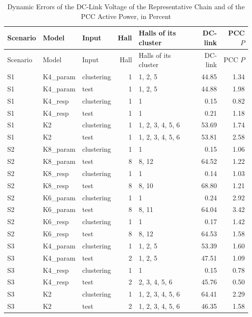 \begin{longtable}{lllrlrr}
\caption{Dynamic Errors of the DC-Link Voltage of the Representative Chain and of the PCC Active Power, in Percent}\label{tab:internal}\\
\toprule Scenario & Model & Input & Hall & Halls of its cluster & DC-link & PCC $P$\\\midrule\endfirsthead
\toprule Scenario & Model & Input & Hall & Halls of its cluster & DC-link & PCC $P$\\\midrule\endhead
S1 & K4\_param & clustering & 1 & 1, 2, 5 & 44.85 & 1.34 \\
S1 & K4\_param & test & 1 & 1, 2, 5 & 44.88 & 1.98 \\
S1 & K4\_resp & clustering & 1 & 1 & 0.15 & 0.82 \\
S1 & K4\_resp & test & 1 & 1 & 0.21 & 1.18 \\
S1 & K2 & clustering & 1 & 1, 2, 3, 4, 5, 6 & 53.69 & 1.74 \\
S1 & K2 & test & 1 & 1, 2, 3, 4, 5, 6 & 53.81 & 2.58 \\
S2 & K8\_param & clustering & 1 & 1 & 0.15 & 1.06 \\
S2 & K8\_param & test & 8 & 8, 12 & 64.52 & 1.22 \\
S2 & K8\_resp & clustering & 1 & 1 & 0.14 & 1.03 \\
S2 & K8\_resp & test & 8 & 8, 10 & 68.80 & 1.21 \\
S2 & K6\_param & clustering & 1 & 1 & 0.24 & 2.92 \\
S2 & K6\_param & test & 8 & 8, 11 & 64.04 & 3.42 \\
S2 & K6\_resp & clustering & 1 & 1 & 0.17 & 1.42 \\
S2 & K6\_resp & test & 8 & 8, 12 & 64.53 & 1.58 \\
S3 & K4\_param & clustering & 1 & 1, 2, 5 & 53.39 & 1.60 \\
S3 & K4\_param & test & 2 & 1, 2, 5 & 47.51 & 1.09 \\
S3 & K4\_resp & clustering & 1 & 1 & 0.15 & 0.78 \\
S3 & K4\_resp & test & 2 & 2, 3, 4, 5, 6 & 45.76 & 0.50 \\
S3 & K2 & clustering & 1 & 1, 2, 3, 4, 5, 6 & 64.41 & 2.29 \\
S3 & K2 & test & 2 & 1, 2, 3, 4, 5, 6 & 46.35 & 1.58 \\
\bottomrule\end{longtable}
